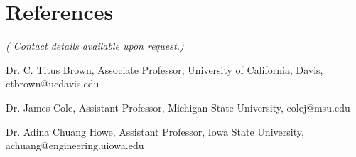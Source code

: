 \documentclass[margin,line]{res}
\newenvironment{list1}{
  \begin{list}{\ding{113}}{%
      \setlength{\itemsep}{0in}
      \setlength{\parsep}{0in} \setlength{\parskip}{0in}
      \setlength{\topsep}{0in} \setlength{\partopsep}{0in} 
      \setlength{\leftmargin}{0.17in}}}{\end{list}}
\begin{document}
\begin{resume}
\begin{list1}
\end{list1}


\section{\sc References} 

{\em ( Contact details available upon request.)}

Dr. C. Titus Brown, Associate Professor, University of California, Davis, ctbrown@ucdavis.edu

Dr. James Cole, Assistant Professor, Michigan State University, colej@msu.edu 

Dr. Adina Chuang Howe, Assistant Professor, Iowa State University, achuang@engineering.uiowa.edu

\end{resume}
\end{document}
